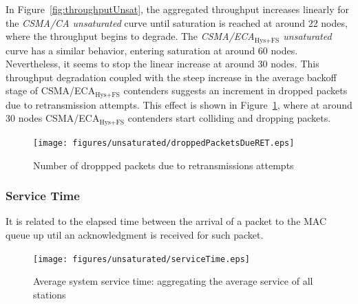 \documentclass[a4paper,journal]{IEEEtran}
\begin{document}
	
	In Figure~\ref{fig:throughputUnsat}, the aggregated throughput increases linearly for the \emph{CSMA/CA unsaturated} curve until saturation is reached at around 22 nodes, where the throughput begins to degrade. The \emph{CSMA/ECA$_{\text{Hys+FS}}$ unsaturated} curve has a similar behavior, entering saturation at around 60 nodes. Nevertheless, it seems to stop the linear increase at around 30 nodes. This throughput degradation coupled with the steep increase in the average backoff stage of CSMA/ECA$_{\text{Hys+FS}}$ contenders suggests an increment in dropped packets due to retransmission attempts. This effect is shown in Figure~\ref{fig:droppedDueToRET}, where at around 30 nodes CSMA/ECA$_{\text{Hys+FS}}$ contenders start colliding and dropping packets.

   	\begin{figure}[htbp]
		\centering
		\texttt{[image: figures/unsaturated/droppedPacketsDueRET.eps]}
		\caption{Number of droppped packets due to retransmissions attempts}
		\label{fig:droppedDueToRET}
	\end{figure}
	
	\subsubsection{Service Time}
	It is related to the elapsed time between the arrival of a packet to the MAC queue up util an acknowledgment is received for such packet.
	
	\begin{figure}[htbp]
		\centering
		\texttt{[image: figures/unsaturated/serviceTime.eps]}
		\caption{Average system service time: aggregating the average service of all stations}
		\label{fig:serviceTime}
	\end{figure}
	
\end{document}
